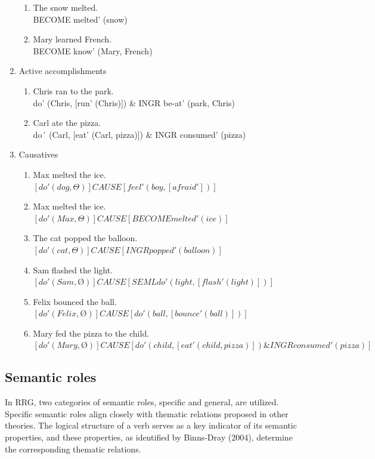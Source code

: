 \begin{enumerate}
\begin{enumerate}
         \item The snow melted. \\
         BECOME melted' (snow)
        \item Mary learned French. \\ 
        BECOME know' (Mary, French)
     \end{enumerate}
    \item Active accomplishments
    \begin{enumerate}
         \item Chris ran to the park. \\
         do' (Chris, [run' (Chris)]) \& INGR be-at' (park, Chris)
        \item Carl ate the pizza. \\
        do´ (Carl, [eat' (Carl, pizza)]) \& INGR consumed' (pizza)
    \end{enumerate}
    \item Causatives
    \begin{enumerate}
        \item Max melted the ice. \\
        $[do' (dog, \Theta)] CAUSE [feel' (boy, [afraid'])]$  
        \item Max melted the ice. \\
        $[do' (Max, \Theta)] CAUSE [BECOME melted' (ice)]$
        \item The cat popped the balloon. \\
        $[do' (cat, \Theta)] CAUSE [INGR popped' (balloon)]$
        \item Sam flashed the light.  \\
        $[do' (Sam, Ø)] CAUSE [SEML do' (light, [flash' (light)])]$
        \item Felix bounced the ball. \\
        $[do' (Felix, Ø)] CAUSE [do' (ball, [bounce' (ball)])]$
        \item Mary fed the pizza to the child.\\
        $[do' (Mary, Ø)] CAUSE [do' (child, [eat' (child, pizza)])
        \& INGR consumed' (pizza)]$
    \end{enumerate}
\end{enumerate}


\subsection{Semantic roles}

In RRG, two categories of semantic roles, specific and general, are utilized. Specific semantic roles align closely with thematic relations proposed in other theories. The logical structure of a verb serves as a key indicator of its semantic properties, and these properties, as identified by Binns-Dray (2004), determine the corresponding thematic relations.

